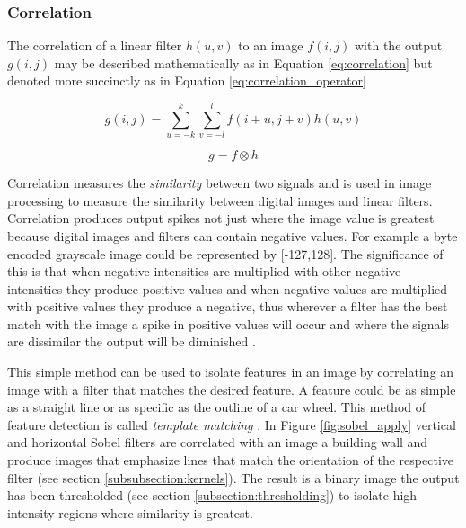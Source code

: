 \subsubsection{Correlation}
\label{subsection:corr}

The correlation of a linear filter $h(u,v)$ to an image $f(i,j)$ with the output $g(i,j)$ may be described mathematically as in Equation \ref{eq:correlation} but denoted more succinctly as in Equation \ref{eq:correlation_operator}

\begin{equation} \label{eq:correlation}
g(i,j) = \sum_{u=-k}^{k}\sum_{v = -l}^{l}f(i+u,j+v)h(u,v)
\end{equation}

\begin{equation} \label{eq:correlation_operator}
g = f \otimes h
\end{equation}

Correlation measures the \emph{similarity} between two signals and is used in image processing to measure the similarity between digital images and linear filters. Correlation produces output spikes not just where the image value is greatest because digital images and filters can contain negative values. For example a byte encoded grayscale image could be represented by [-127,128]. The significance of this is that when negative intensities are multiplied with other negative intensities they produce positive values and when negative values are multiplied with positive values they produce a negative, thus wherever a filter has the best match with the image a spike in positive values will occur and where the signals are dissimilar the output will be diminished \cite{optimalKernel}\cite{udacity_cv}. 

This simple method can be used to isolate features in an image by correlating an image with a filter that matches the desired feature. A feature could be as simple as a straight line or as specific as the outline of a car wheel. This method of feature detection is called \emph{template matching} \cite{oreilly_python}. In Figure \ref{fig:sobel_apply} vertical and horizontal Sobel filters are correlated with an image a building wall and produce images that emphasize lines that match the orientation of the respective filter (see section \ref{subsubsection:kernels}). The result is a binary image the output has been thresholded (see section \ref{subsection:thresholding}) to isolate high intensity regions where similarity is greatest.

